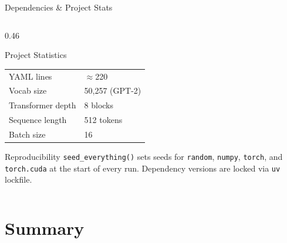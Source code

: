 \documentclass[aspectratio=169, 10pt]{beamer}
\begin{document}
\begin{frame}{Dependencies \& Project Stats}
\begin{columns}[T]
\begin{column}{0.46\textwidth}
\begin{block}{Project Statistics}
\begin{tabular}{ll}
          YAML lines       & $\approx$220 \\
          Vocab size       & 50,257 (GPT-2) \\
          Transformer depth & 8 blocks \\
          Sequence length  & 512 tokens \\
          Batch size       & 16 \\
          \bottomrule
        \end{tabular}
      \end{block}
      \begin{alertblock}{Reproducibility}
        \texttt{seed\_everything()} sets seeds for \texttt{random}, \texttt{numpy},
        \texttt{torch}, and \texttt{torch.cuda} at the start of every run.
        Dependency versions are locked via \texttt{uv} lockfile.
      \end{alertblock}
    \end{column}
  \end{columns}
\end{frame}


\section{Summary}
\end{document}
